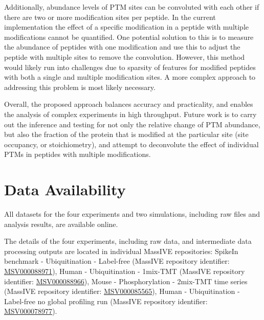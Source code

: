 \documentclass[mcp]{article}
\numberwithin{table}{section}
\begin{document}
Additionally, abundance levels of PTM sites can be convoluted with each other if there are two or more modification sites per peptide. In the current implementation the effect of a specific modification in a peptide with multiple modifications cannot be quantified. One potential solution to this is to measure the abundance of peptides with one modification and use this to adjust the peptide with multiple sites to remove the convolution. However, this method would likely run into challenges due to sparsity of features for modified peptides with both a single and multiple modification sites. A more complex approach to addressing this problem is most likely necessary.

Overall, the proposed approach balances accuracy and practicality, and enables the analysis of complex experiments in high throughput. Future work is to carry out the inference and testing for not only the relative change of PTM abundance, but also the fraction of the protein that is modified at the particular site (site occupancy, or stoichiometry), and attempt to deconvolute the effect of individual PTMs in peptides with multiple modifications.

\section{Data Availability}

All datasets for the four experiments and two simulations, including raw files and analysis results, are available online.

The details of the four experiments, including raw data, and intermediate data processing outputs are located in individual MassIVE repositories: SpikeIn benchmark - Ubiquitination - Label-free (MassIVE repository identifier: \href{https://massive.ucsd.edu/ProteoSAFe/private-dataset.jsp?task=c4c583ecf7f941cdac87f7a4f872517b}{MSV000088971}), Human - Ubiquitination - 1mix-TMT (MassIVE repository identifier: \href{https://massive.ucsd.edu/ProteoSAFe/dataset.jsp?task=b6f0c74c234247678fb0888c6df1f225}{MSV000088966}), Mouse - Phosphorylation - 2mix-TMT time series (MassIVE repository identifier: \href{https://massive.ucsd.edu/ProteoSAFe/dataset.jsp?task=4878d777c6b34cf8aaf8477e93140c4d}{MSV000085565}), Human - Ubiquitination - Label-free no global profiling run (MassIVE repository identifier: \href{https://massive.ucsd.edu/ProteoSAFe/dataset.jsp?task=1b516164de5345108b40b75147dd58b5}{MSV000078977}).
\end{document}
